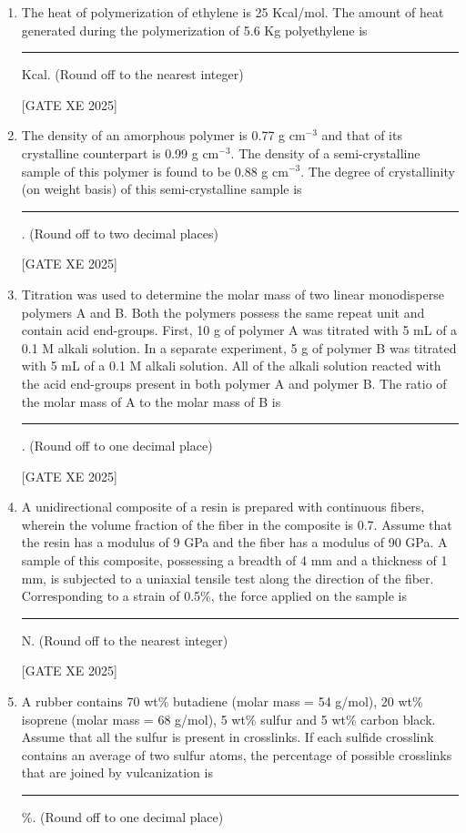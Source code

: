 \documentclass[journal,12pt,onecolumn]{IEEEtran}
\theoremstyle{remark}
\begin{document}
\begin{enumerate}
\item The heat of polymerization of ethylene is 25 Kcal/mol. The amount of heat generated during the polymerization of 5.6 Kg polyethylene is \rule{3cm}{0.15mm} Kcal. (Round off to the nearest integer)

\hfill[GATE XE 2025]

\item The density of an amorphous polymer is 0.77 g cm$^{-3}$ and that of its crystalline counterpart is 0.99 g cm$^{-3}$. The density of a semi-crystalline sample of this polymer is found to be 0.88 g cm$^{-3}$. The degree of crystallinity (on weight basis) of this semi-crystalline sample is \rule{3cm}{0.15mm}. (Round off to two decimal places)

\hfill[GATE XE 2025]

\item Titration was used to determine the molar mass of two linear monodisperse polymers A and B. Both the polymers possess the same repeat unit and contain acid end-groups. First, 10 g of polymer A was titrated with 5 mL of a 0.1 M alkali solution. In a separate experiment, 5 g of polymer B was titrated with 5 mL of a 0.1 M alkali solution. All of the alkali solution reacted with the acid end-groups present in both polymer A and polymer B. The ratio of the molar mass of A to the molar mass of B is \rule{3cm}{0.15mm}. (Round off to one decimal place)

\hfill[GATE XE 2025]

\item A unidirectional composite of a resin is prepared with continuous fibers, wherein the volume fraction of the fiber in the composite is 0.7. Assume that the resin has a modulus of 9 GPa and the fiber has a modulus of 90 GPa. A sample of this composite, possessing a breadth of 4 mm and a thickness of 1 mm, is subjected to a uniaxial tensile test along the direction of the fiber. Corresponding to a strain of 0.5\%, the force applied on the sample is \rule{3cm}{0.15mm} N. (Round off to the nearest integer)

\hfill[GATE XE 2025]

\item A rubber contains 70 wt\% butadiene (molar mass = 54 g/mol), 20 wt\% isoprene (molar mass = 68 g/mol), 5 wt\% sulfur and 5 wt\% carbon black. Assume that all the sulfur is present in crosslinks. If each sulfide crosslink contains an average of two sulfur atoms, the percentage of possible crosslinks that are joined by vulcanization is \rule{3cm}{0.15mm}\%. (Round off to one decimal place)


\end{enumerate}
\end{document}
